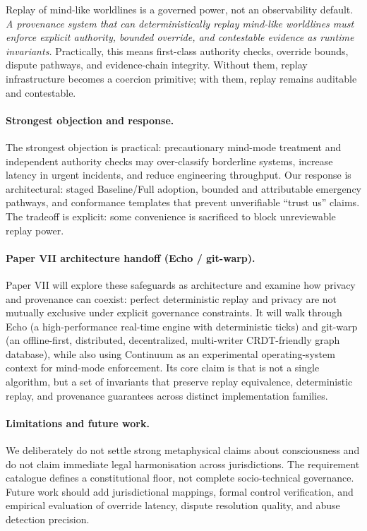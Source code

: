 \documentclass[11pt]{article}
\theoremstyle{definition}
\theoremstyle{plain}
\theoremstyle{remark}
\DeclareRobustCommand{\WARP}{\ifmmode\mathit{WARP}\else{\upshape\scshape warp}\fi}
\begin{document}
Replay of mind-like worldlines is a governed power, not an observability default.
\emph{A provenance system that can deterministically replay mind-like worldlines must enforce explicit authority, bounded override, and contestable evidence as runtime invariants.}
Practically, this means first-class authority checks, override bounds, dispute pathways, and evidence-chain integrity.
Without them, replay infrastructure becomes a coercion primitive; with them, replay remains auditable and contestable.

\paragraph{Strongest objection and response.}
The strongest objection is practical: precautionary mind-mode treatment and independent authority checks
may over-classify borderline systems, increase latency in urgent incidents, and reduce engineering
throughput.
Our response is architectural: staged Baseline/Full adoption, bounded and attributable emergency pathways, and conformance templates that prevent unverifiable ``trust us'' claims.
The tradeoff is explicit: some convenience is sacrificed to block unreviewable replay power.

\paragraph{Paper VII architecture handoff (Echo / git-warp).}
Paper VII will explore these safeguards as architecture and examine how privacy and provenance can coexist:
perfect deterministic replay and privacy are not mutually exclusive under explicit governance constraints.
It will walk through Echo (a high-performance real-time engine with deterministic ticks) and git-warp (an
offline-first, distributed, decentralized, multi-writer CRDT-friendly graph database), while also using
Continuum as an experimental operating-system context for mind-mode enforcement.
Its core claim is that \WARP{} is not a single algorithm, but a set of invariants that preserve replay
equivalence, deterministic replay, and provenance guarantees across distinct implementation families.

\paragraph{Limitations and future work.}
We deliberately do not settle strong metaphysical claims about consciousness and do not claim immediate legal harmonisation
across jurisdictions.
The requirement catalogue defines a constitutional floor, not complete socio-technical governance.
Future work should add jurisdictional mappings, formal control verification, and empirical evaluation of
override latency, dispute resolution quality, and abuse detection precision.
\end{document}
